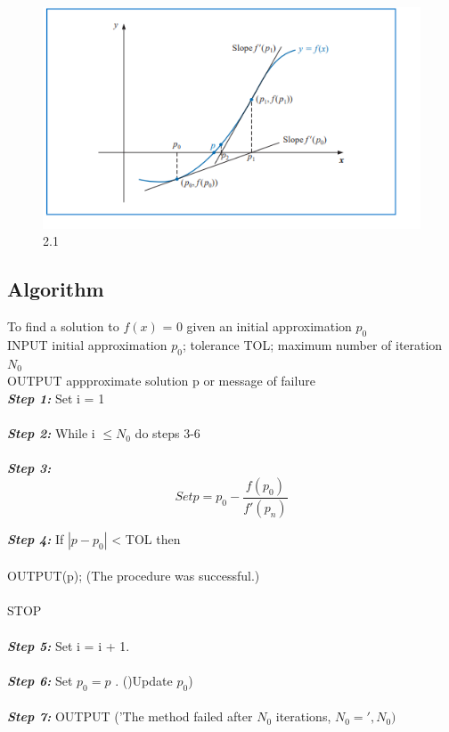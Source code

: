 \documentclass[12pt,a4paper]{article}
\begin{document}
	\begin{figure}[h]
	\centering
	\includegraphics[width=1\textwidth]{Nr_fig_0.png} %
	\caption{2.1}
	
\end{figure}
\newpage
	\subsection{Algorithm} 
	To find a solution to \(f(x)\) = 0 given an initial approximation $p_{0}$ \\
	INPUT initial approximation $p_{0}$; tolerance TOL; maximum number of iteration $N_{0}$ \\
	OUTPUT appproximate solution p or message of failure \\
	
	\textbf{\textit{Step 1:}} Set i = 1\\ \\
	\textbf{\textit{Step 2:}}	While i $\leq N_{0}$ do steps 3-6 \\ \\
	\textbf{\textit{Step 3:}} 
	\[
	Set p = p_0 - \frac{f(p_0)}{f'(p_n)}
	\]  
	
	
	\textbf{\textit{Step 4:}} If $|p - p_{0}|$ < TOL then \\\\
								OUTPUT(p); (The procedure was successful.)\\ \\
								STOP \\\\
	\textbf{\textit{Step 5:}} Set i = i + 1. \\ \\
	\textbf{\textit{Step 6:}} Set $p_{0}=p$ . ()Update $p_{0}$) \\ \\
	\textbf{\textit{Step 7:}} OUTPUT ('The method failed after $N_{0}$ iterations, $N_{0}=',N_{0})$ 
	
\end{document}
